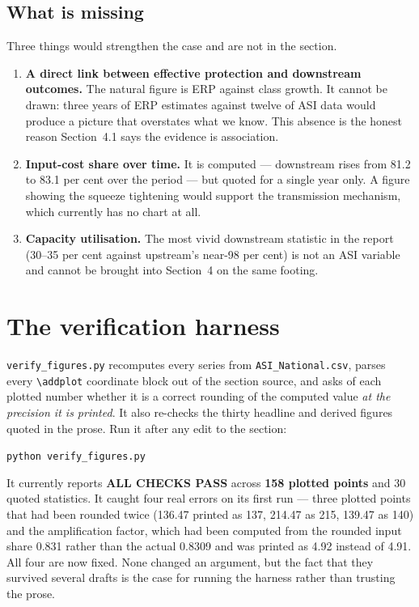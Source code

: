 \documentclass[11pt, a4paper]{article}
\begin{document}
\subsection{What is missing}

Three things would strengthen the case and are not in the section.

\begin{enumerate}[leftmargin=1.6em, itemsep=3pt]
\item \textbf{A direct link between effective protection and downstream outcomes.}
The natural figure is ERP against class growth. It cannot be drawn: three years of ERP
estimates against twelve of ASI data would produce a picture that overstates what we
know. This absence is the honest reason Section~4.1 says the evidence is association.
\item \textbf{Input-cost share over time.} It is computed --- downstream rises from 81.2
to 83.1 per cent over the period --- but quoted for a single year only. A figure showing
the squeeze tightening would support the transmission mechanism, which currently has
no chart at all.
\item \textbf{Capacity utilisation.} The most vivid downstream statistic in the report
(30--35 per cent against upstream's near-98 per cent) is not an ASI variable and cannot
be brought into Section~4 on the same footing.
\end{enumerate}

\section{The verification harness}

\texttt{verify\_figures.py} recomputes every series from
\texttt{ASI\_National.csv}, parses every \texttt{\textbackslash addplot} coordinate
block out of the section source, and asks of each plotted number whether it is a
correct rounding of the computed value \emph{at the precision it is printed}. It also
re-checks the thirty headline and derived figures quoted in the prose. Run it after
any edit to the section:

\begin{center}\texttt{python verify\_figures.py}\end{center}

\noindent It currently reports \textbf{ALL CHECKS PASS} across \textbf{158 plotted points} and
30 quoted statistics. It caught four real errors on its first run --- three plotted
points that had been rounded twice (136.47 printed as 137, 214.47 as 215, 139.47 as
140) and the amplification factor, which had been computed from the rounded input
share 0.831 rather than the actual 0.8309 and was printed as 4.92 instead of 4.91.
All four are now fixed. None changed an argument, but the fact that they survived
several drafts is the case for running the harness rather than trusting the prose.
\end{document}
